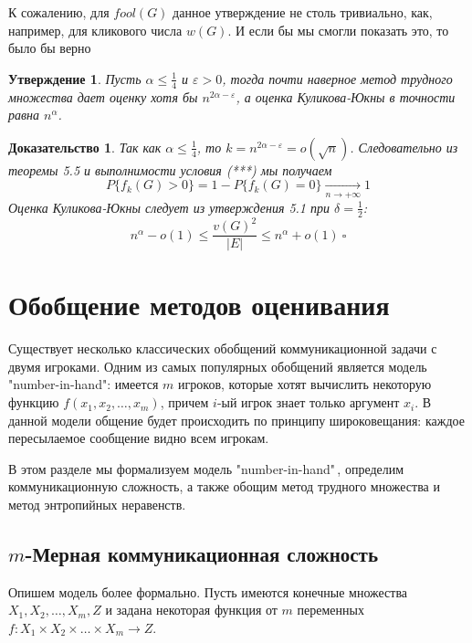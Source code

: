 \documentclass[a4paper]{article}
\newtheorem*{msolution}{Доказательство}
\newtheorem{mclaim}{Утверждение}[section]
\begin{document}
К сожалению, для $fool(G)$ данное утверждение не столь тривиально, как, например, для кликового числа $w(G)$. И если бы 
мы смогли показать это, то было бы верно
\begin{mclaim}
    Пусть $\alpha \leq \frac{1}{4}$ и $\varepsilon > 0$, тогда почти наверное 
    метод трудного множества дает оценку хотя бы $n^{2\alpha - \varepsilon}$, а оценка Куликова-Юкны в 
    точности равна $n^{\alpha}$. 
\end{mclaim}
\begin{msolution}
    Так как $\alpha \leq \frac{1}{4}$, то $k = n^{2\alpha - \varepsilon} = o(\sqrt{n})$. Следовательно из 
    теоремы 5.5 и выполнимости условия (***) мы получаем $$P\{f_k(G) > 0\} = 1 - P\{f_k(G) = 0\}\xrightarrow[n \to +\infty]{} 1$$
    Оценка Куликова-Юкны следует из утверждения 5.1 при $\delta = \frac{1}{2}$:
    $$n^{\alpha} - o(1) \leq \frac{v(G)^2}{|E|} \leq n^{\alpha} + o(1)\ \square$$ 
\end{msolution}



\setcounter{mclaim}{0}
\setcounter{mlemma}{0}	
\setcounter{mtheorem}{0}
\addtocounter{section}{1}
\section*{Обобщение методов оценивания}
Существует несколько классических обобщений коммуникационной задачи с двумя игроками. Одним из самых 
популярных обобщений является модель "number-in-hand": имеется $m$ игроков, которые хотят вычислить 
некоторую функцию $f(x_1,x_2,\ldots,x_m)$, причем $i$-ый игрок знает только аргумент $x_i$. В данной модели 
общение будет происходить по принципу широковещания: каждое пересылаемое сообщение видно всем игрокам.

В этом разделе мы формализуем модель "number-in-hand"\,, определим коммуникационную сложность, а также 
обощим метод трудного множества и метод энтропийных неравенств.

\setcounter{subsection}{0}
\subsection{$m$-Мерная коммуникационная сложность}

Опишем модель более формально. Пусть имеются конечные множества $X_1, X_2, \ldots, X_m, Z$ и задана
некоторая функция от $m$ переменных $f:X_1\times X_2\times \ldots\times X_m\rightarrow Z$.
\end{document}
